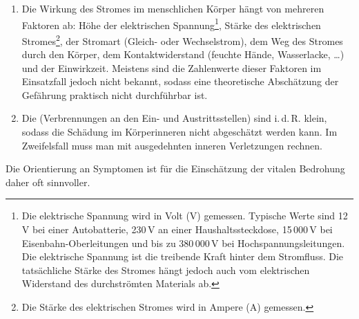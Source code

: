 \begin{enumerate}
  \item Die Wirkung des Stromes im menschlichen Körper hängt von mehreren
  Faktoren ab: Höhe der elektrischen Spannung\footnote{Die elektrische Spannung
  wird in Volt (V) gemessen. Typische Werte sind 12\,V bei einer Autobatterie,
  230\,V an einer Haushaltssteckdose, 15\,000\,V bei Eisenbahn-Oberleitungen
  und bis zu 380\,000\,V bei Hochspannungsleitungen. Die elektrische Spannung
  ist die treibende Kraft hinter dem Stromfluss. Die tatsächliche Stärke des
  Stromes hängt jedoch auch vom elektrischen Widerstand des durchströmten
  Materials ab.}, Stärke des elektrischen Stromes\footnote{Die Stärke des
  elektrischen Stromes wird in Ampere (A) gemessen.}, der
  Stromart (Gleich- oder Wechselstrom), dem Weg des Stromes
  durch den Körper, dem Kontaktwiderstand (feuchte Hände,
  Wasserlacke, \ldots) und der Einwirkzeit. Meistens sind
  die Zahlenwerte dieser Faktoren im Einsatzfall jedoch
  nicht bekannt, sodass eine theoretische Abschätzung der
  Gefährung praktisch nicht durchführbar ist. 
  \item Die  (Verbrennungen an den Ein- und
  Austrittsstellen) sind i.\,d.\,R. klein, sodass die Schädung im Körperinneren nicht abgeschätzt
  werden kann. Im Zweifelsfall muss man mit ausgedehnten inneren Verletzungen
  rechnen.
\end{enumerate}
Die Orientierung an Symptomen ist für die Einschätzung der vitalen Bedrohung
daher oft sinnvoller.

